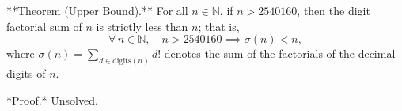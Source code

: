 
**Theorem (Upper Bound).** For all $n \in \mathbb{N}$, if $n > 2540160$, then the digit factorial sum of $n$ is strictly less than $n$; that is,
$$\forall\, n \in \mathbb{N},\quad n > 2540160 \implies \sigma(n) < n,$$
where $\sigma(n) = \sum_{d \in \text{digits}(n)} d!$ denotes the sum of the factorials of the decimal digits of $n$.

*Proof.* Unsolved.